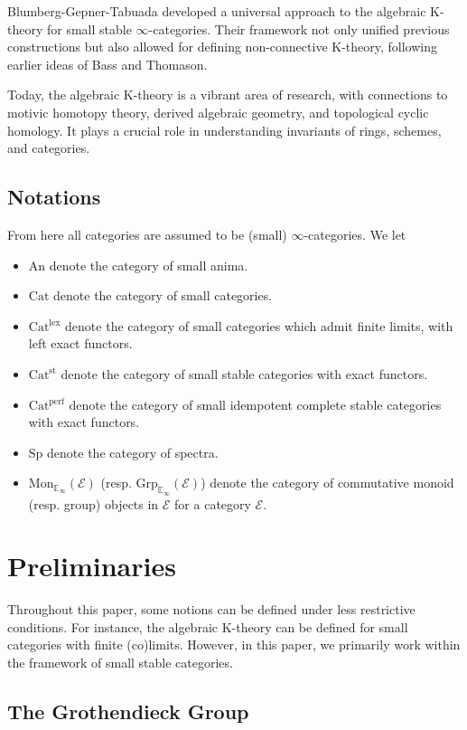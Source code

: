 \documentclass[a4paper,dvipdfmx,11pt,reqno]{amsart}
\newcommand{\E}{\mathcal{E}}
\newcommand{\An}{\mathrm{An}}
\newcommand{\Cat}{\mathrm{Cat}}
\newcommand{\Catlex}{\mathrm{Cat^{lex}}}
\newcommand{\Catperf}{\mathrm{Cat^{perf}}}
\newcommand{\Catst}{\mathrm{Cat^{st}}}
\newcommand{\Mon}{\mathrm{Mon}_{\mathbb{E}_{\infty}}}
\newcommand{\Grp}{\mathrm{Grp}_{\mathbb{E}_{\infty}}}
\newcommand{\Sp}{\mathrm{Sp}}
\theoremstyle{definition}
\begin{document}
Blumberg-Gepner-Tabuada developed a universal approach to the algebraic K-theory for small stable $\infty$-categories.
Their framework not only unified previous constructions but also allowed for defining non-connective K-theory, following earlier ideas of Bass and Thomason.

Today, the algebraic K-theory is a vibrant area of research, with connections to motivic homotopy theory, derived algebraic geometry, and topological cyclic homology. 
It plays a crucial role in understanding invariants of rings, schemes, and categories.

\subsection{Notations}

From here all categories are assumed to be (small) $\infty$-categories.
We let 
\begin{itemize}
  \item $\An$ denote the category of small anima.
  \item $\Cat$ denote the category of small categories.
  \item $\Catlex$ denote the category of small categories which admit finite limits, with left exact functors.
  \item $\Catst$ denote the category of small stable categories with exact functors.
  \item $\Catperf$ denote the category of small idempotent complete stable categories with exact functors.
  \item $\Sp$ denote the category of spectra.
  \item $\Mon(\E)$ (resp. $\Grp(\E)$) denote the category of commutative monoid (resp. group) objects in $\E$ for a category $\E$.
\end{itemize}


\section{Preliminaries} \label{sec.preliminaries}

Throughout this paper, some notions can be defined under less restrictive conditions.  
For instance, the algebraic K-theory can be defined for small categories with finite (co)limits.  
However, in this paper, we primarily work within the framework of small stable categories.

\subsection{The Grothendieck Group} 
\end{document}
